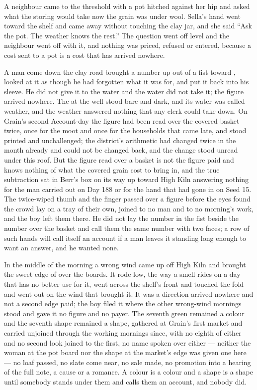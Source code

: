 \scenebreak

A neighbour came to the threshold with a pot hitched against her hip and asked what the storing would take now the grain was under wool. Sella's hand went toward the shelf and came away without touching the clay jar, and she said “Ask the pot. The weather knows the rest.” The question went off level and the neighbour went off with it, and nothing was priced, refused or entered, because a cost sent to a pot is a cost that has arrived nowhere.

A man come down the clay road brought a number up out of a fist toward , looked at it as though he had forgotten what it was for, and put it back into his sleeve. He did not give it to the water and the water did not take it; the figure arrived nowhere. The  at the well stood bare and dark, and its water was called weather, and the weather answered nothing that any clerk could take down. On Grain's second Account-day the figure had been read over the covered basket twice, once for the moot and once for the households that came late, and  stood printed and unchallenged; the district's arithmetic had changed twice in the month already and could not be changed back, and the change stood unread under this roof. But the figure read over a basket is not the figure paid and knows nothing of what the covered grain cost to bring in, and the true subtraction sat in Berr's box on its way up toward High Kiln answering nothing for the man carried out on Day 188 or for the hand that had gone in on Seed 15. The twice-wiped thumb and the finger passed over a figure before the eyes found the crowd lay on a tray of their own, joined to no man and to no morning's work, and the boy left them there. He did not lay the number in the fist beside the number over the basket and call them the same number with two faces; a row of such hands will call itself an account if a man leaves it standing long enough to want an answer, and he wanted none.

\scenebreak

In the middle of the morning a wrong wind came up off High Kiln and brought the sweet edge of  over the boards. It rode low, the way a smell rides on a day that has no better use for it, went across the shelf's front and touched the fold and went out on the wind that brought it. It was a direction arrived nowhere and not a second edge paid; the boy filed it where the other wrong-wind mornings stood and gave it no figure and no payer. The seventh green remained a colour and the seventh shape remained a shape, gathered at Grain's first market and carried unjoined through the working mornings since, with no eighth of either and no second look joined to the first, no name spoken over either --- neither the woman at the pot board nor the shape at the market's edge was given one here --- no loaf passed, no slate come near, no sale made, no promotion into a hearing of the full note, a cause or a romance. A colour is a colour and a shape is a shape until somebody stands under them and calls them an account, and nobody did.

